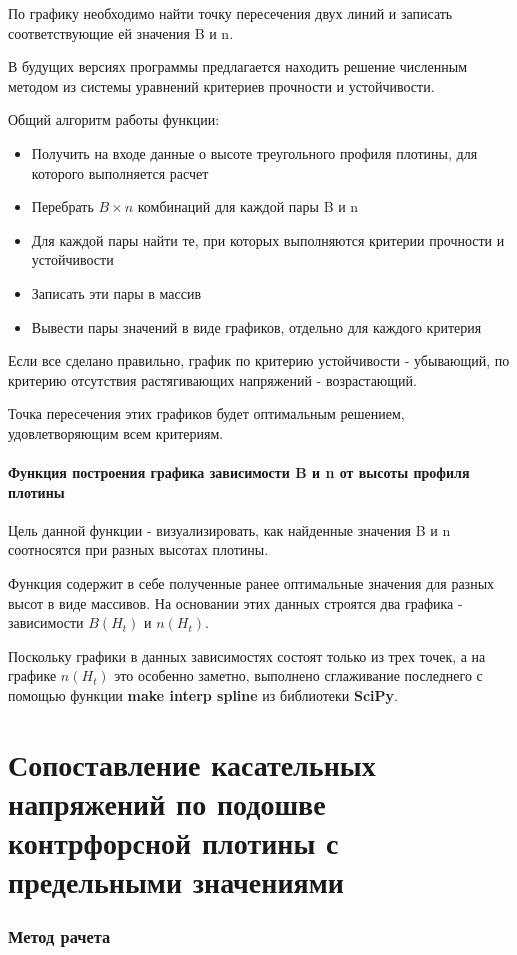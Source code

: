 \documentclass[12pt,a4paper,oneside,draft,titlepage]{article}
\begin{document}
По графику необходимо найти точку пересечения двух линий и записать соответствующие ей значения B и n.

В будущих версиях программы предлагается находить решение численным методом из системы уравнений критериев прочности и устойчивости.

Общий алгоритм работы функции:
\begin{itemize}
	\item Получить на входе данные о высоте треугольного профиля плотины, для которого выполняется расчет
	\item Перебрать $B \times n$ комбинаций для каждой пары B и n
	\item Для каждой пары найти те, при которых выполняются критерии прочности и устойчивости
	\item Записать эти пары в массив
	\item Вывести пары значений в виде графиков, отдельно для каждого критерия
\end{itemize}

Если все сделано правильно, график по критерию устойчивости - убывающий, по критерию отсутствия растягивающих напряжений - возрастающий.

Точка пересечения этих графиков будет оптимальным решением, удовлетворяющим всем критериям.

\subsection{Функция построения графика зависимости B и n от высоты профиля плотины}

Цель данной функции - визуализировать, как найденные значения B и n соотносятся при разных высотах плотины.

Функция содержит в себе полученные ранее оптимальные значения для разных высот в виде массивов. На основании этих данных строятся два графика - зависимости $B(H_t)$ и $n(H_t)$.

Поскольку графики в данных зависимостях состоят только из трех точек, а на графике  $n(H_t)$ это особенно заметно, выполнено сглаживание последнего с помощью функции \textbf{make interp spline} из библиотеки \textbf{SciPy}.

\part{Сопоставление касательных напряжений по подошве контрфорсной плотины с предельными значениями}

\section{Метод рачета}
\end{document}
